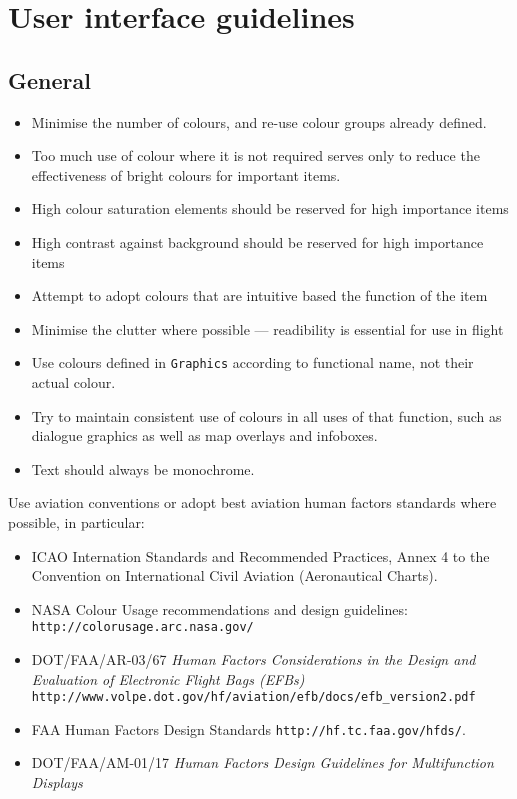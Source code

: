 \documentclass[a4paper,12pt]{refrep}
\begin{document}
\chapter{User interface guidelines}

\section{General}

\begin{itemize}
\item Minimise the number of colours, and re-use colour groups already defined.
\item Too much use of colour where it is not required serves only to reduce 
 the effectiveness of bright colours for important items.
\item High colour saturation elements should be reserved for high importance items
\item High contrast against background should be reserved for high importance items
\item Attempt to adopt colours that are intuitive based the function of the item
\item Minimise the clutter where possible --- readibility is essential for use 
 in flight
\item Use colours defined in \verb|Graphics| according to functional name, not 
 their actual colour.
\item Try to maintain consistent use of colours in all uses of that function, 
 such as dialogue graphics as well as map overlays and infoboxes.
\item Text should always be monochrome.
\end{itemize}

Use aviation conventions or adopt best aviation human factors
standards where possible, in particular:
\begin{itemize}
\item ICAO Internation Standards and Recommended Practices, Annex 4 to the 
 Convention on International Civil Aviation (Aeronautical Charts).
\item NASA Colour Usage recommendations and design guidelines: \verb|http://colorusage.arc.nasa.gov/|
\item DOT/FAA/AR-03/67 {\em Human Factors Considerations in the Design and 
 Evaluation of Electronic Flight Bags (EFBs)} \verb|http://www.volpe.dot.gov/hf/aviation/efb/docs/efb_version2.pdf|
\item FAA Human Factors Design Standards \verb|http://hf.tc.faa.gov/hfds/|.
\item DOT/FAA/AM-01/17 {\em Human Factors Design Guidelines for Multifunction Displays}
\end{itemize}
\end{document}
